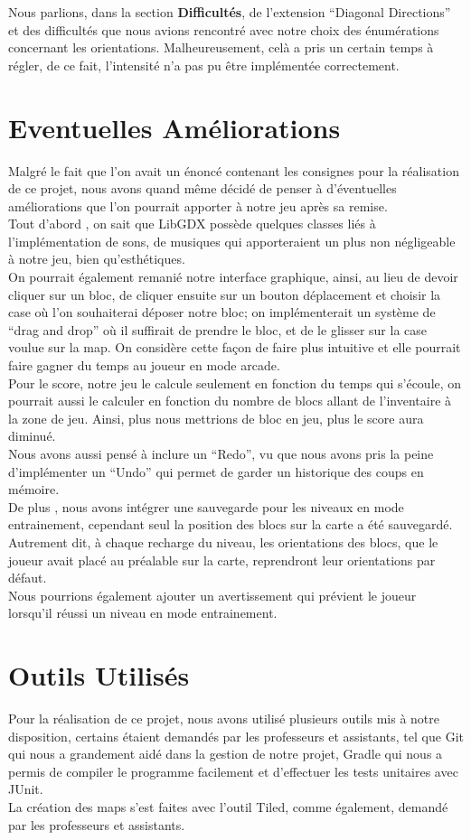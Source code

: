 \documentclass[a4paper,10pt]{article}
\begin{document}
Nous parlions, dans la section \textbf{Difficultés}, de l'extension ``Diagonal Directions'' et des difficultés que nous avions rencontré avec notre
choix des énumérations concernant les orientations. Malheureusement, celà a pris un certain temps à régler, de ce fait, l'intensité n'a pas pu être implémentée
correctement.


\section{Eventuelles Améliorations}
Malgré le fait que l'on avait un énoncé contenant les consignes pour la réalisation de ce projet, nous avons quand même décidé de penser à d'éventuelles
améliorations que l'on pourrait apporter à notre jeu après sa remise.\\
Tout d'abord , on sait que LibGDX possède quelques classes liés à l'implémentation de sons, de musiques qui apporteraient un plus
non négligeable à notre jeu, bien qu'esthétiques.\\
On pourrait également remanié notre interface graphique, ainsi, au lieu de devoir cliquer sur un bloc, de cliquer ensuite sur un bouton déplacement
et choisir la case où l'on souhaiterai déposer notre bloc; on implémenterait un système de ``drag and drop'' où il suffirait de prendre le bloc,
et de le glisser sur la case voulue sur la map. On considère cette façon de faire plus intuitive et elle pourrait faire gagner du temps au joueur
en mode arcade.\\
Pour le score, notre jeu le calcule seulement en fonction du temps qui s'écoule, on pourrait aussi le calculer en fonction du nombre de blocs allant
de l'inventaire à la zone de jeu. Ainsi, plus nous mettrions de bloc en jeu, plus le score aura diminué. \\
Nous avons aussi pensé à inclure un ``Redo'', vu que nous avons pris la peine d'implémenter un ``Undo'' qui permet de garder un historique des coups en
mémoire. \\
De plus , nous avons intégrer une sauvegarde pour les niveaux en mode entrainement, cependant seul la position des blocs sur la carte a été sauvegardé.
Autrement dit, à chaque recharge du niveau, les orientations des blocs, que le joueur avait placé au préalable sur la carte, reprendront leur 
orientations par défaut.\\
Nous pourrions également ajouter un avertissement qui prévient le joueur lorsqu'il réussi un niveau en mode entrainement.

\section{Outils Utilisés}
Pour la réalisation de ce projet, nous avons utilisé plusieurs outils mis à notre disposition, certains étaient demandés par les professeurs et assistants,
tel que Git qui nous a grandement aidé dans la gestion de notre projet, Gradle qui nous a permis de compiler le programme facilement et d'effectuer les tests unitaires
avec JUnit.\\
La création des maps s'est faites avec l'outil Tiled, comme également, demandé par les professeurs et assistants. \\
\end{document}
